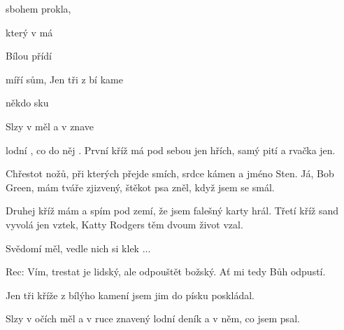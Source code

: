 
\zs
{} sbohem  prokla,

který v  má  

Bílou přídí  

míří sům,  
\ks
\zr
Jen tři  z bí kame

někdo sku 

Slzy v  měl a v  znave

lodní , co  do něj .
\kr
\zs
První kříž má pod sebou jen hřích, samý pití a rvačka jen.

Chřestot nožů, při kterých přejde smích, srdce kámen a jméno Sten.
\ks
\zr  \kr
\zs
Já, Bob Green, mám tváře zjizvený, štěkot psa zněl, když jsem se smál.

Druhej kříž mám a spím pod zemí, že jsem falešný karty hrál.
\ks
\zr  \kr
\zs
Třetí kříž sand vyvolá jen vztek, Katty Rodgers těm dvoum život vzal.

Svědomí měl, vedle nich si klek ...
\ks

Rec: Vím, trestat je lidský, ale odpouštět božský. Ať mi tedy Bůh odpustí.

\zr
Jen tři kříže z bílýho kamení jsem jim do písku poskládal.

Slzy v očích měl a v ruce znavený lodní deník a v něm, co jsem psal.
\kr
\kp
























